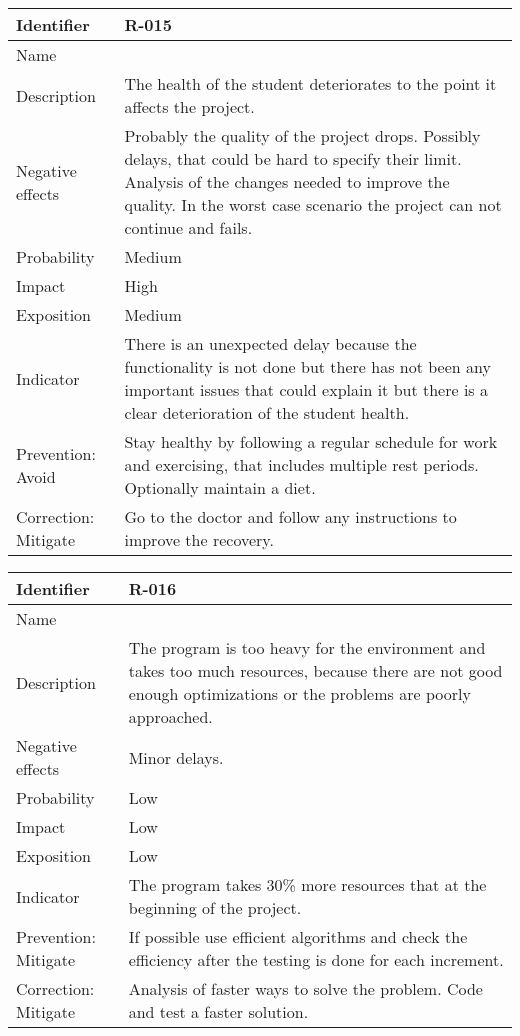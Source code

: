 \begin{table}[H]
	\begin{tabularx}{\textwidth}{|y|z|}
		\hline
		Identifier & \textbf{R-015} \\ \hline
		Name & \Rquince \\ \hline
		Description &
			The health of the student deteriorates to the point it affects the project.
		\\ \hline
		Negative effects &
			Probably the quality of the project drops. \linej
			Possibly delays, that could be hard to specify their limit. \linej
			Analysis of the changes needed to improve the quality. \linej
			In the worst case scenario the project can not continue and fails.
		\\ \hline
		Probability & Medium\\ \hline
		Impact &  High\\ \hline
		Exposition &  Medium\\ \hline
		Indicator & There is an unexpected delay because the functionality is not done but there has not been any important issues that could explain it but there is a clear deterioration of the student health. \\ \hline
		Prevention: Avoid &
			Stay healthy by following a regular schedule for work and exercising, that includes multiple rest periods. \linej
			Optionally maintain a diet.
		\\ \hline
		Correction: Mitigate &
			Go to the doctor and follow any instructions to improve the recovery.
		\\ \hline
	\end{tabularx}
\end{table}

\begin{table}[H]
	\begin{tabularx}{\textwidth}{|y|z|}
		\hline
		Identifier & \textbf{R-016} \\ \hline
		Name & \Rdieciseis \\ \hline
		Description &
			The program is too heavy for the environment and takes too much resources, because there are not good enough optimizations or the problems are poorly approached.
		\\ \hline
		Negative effects &
			Minor delays. \linej
		\\ \hline
		Probability & Low\\ \hline
		Impact &  Low\\ \hline
		Exposition &  Low\\ \hline
		Indicator & The program takes 30\% more resources that at the beginning of the project.\\ \hline
		Prevention: Mitigate &
			If possible use efficient algorithms and check the efficiency after the testing is done for each increment.
		\\ \hline
		Correction: Mitigate &
			Analysis of faster ways to solve the problem.\linej
			Code and test a faster solution.
		\\ \hline
	\end{tabularx}
\end{table}

